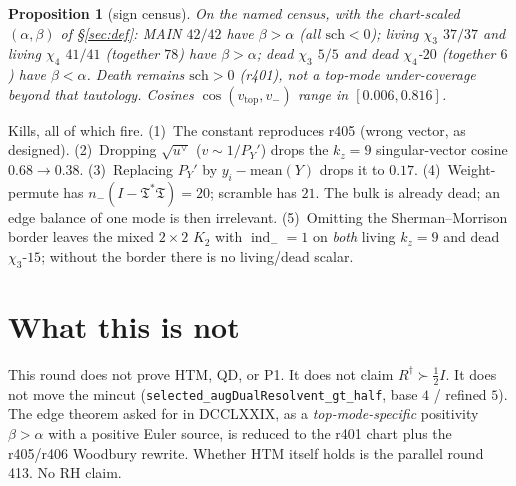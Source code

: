 \documentclass[11pt]{article}
\newtheorem{prop}{Proposition}
\theoremstyle{remark}
\newcommand{\indm}{\operatorname{ind}_{-}}
\newcommand{\Tfrak}{\mathfrak{T}}
\newcommand{\sch}{\mathrm{sch}}
\begin{document}
\begin{prop}[sign census]\label{prop:census}
On the named census, with the chart-scaled
$(\alpha,\beta)$ of \S\ref{sec:def}:
MAIN $42/42$ have $\beta>\alpha$ (all $\sch<0$);
living $\chi_3$ $37/37$ and living $\chi_4$ $41/41$
(together $78$) have $\beta>\alpha$;
dead $\chi_3$ $5/5$ and dead $\chi_4$-$20$ (together $6$)
have $\beta<\alpha$.
Death remains $\sch>0$ (r401), not a top-mode under-coverage
beyond that tautology.
Cosines $\cos(v_{\mathrm{top}},v_{-})$ range in
$[0.006,0.816]$.
\end{prop}

Kills, all of which fire.
(1)~The constant reproduces r405 (wrong vector, as designed).
(2)~Dropping $\sqrt{u^\vee}$ ($v\sim 1/P_Y'$) drops the
$k_z=9$ singular-vector cosine $0.68\to 0.38$.
(3)~Replacing $P_Y'$ by $y_i-\mathrm{mean}(Y)$ drops it to
$0.17$.
(4)~Weight-permute has $n_{-}(I-\Tfrak^*\Tfrak)=20$; scramble
has $21$.  The bulk is already dead; an edge balance of one
mode is then irrelevant.
(5)~Omitting the Sherman--Morrison border leaves the mixed
$2\times 2$ $K_2$ with $\indm=1$ on \emph{both} living $k_z=9$
and dead $\chi_3$-$15$; without the border there is no
living/dead scalar.

\section{What this is not}

This round does not prove HTM, QD, or P1.
It does not claim $R^\dagger\succ\tfrac12 I$.
It does not move the mincut
(\texttt{selected\_augDualResolvent\_gt\_half},
base $4$ / refined $5$).
The edge theorem asked for in DCCLXXIX, as a
\emph{top-mode-specific} positivity $\beta>\alpha$ with a
positive Euler source, is reduced to the r401 chart plus
the r405/r406 Woodbury rewrite.
Whether HTM itself holds is the parallel round 413.
No RH claim.
\end{document}
